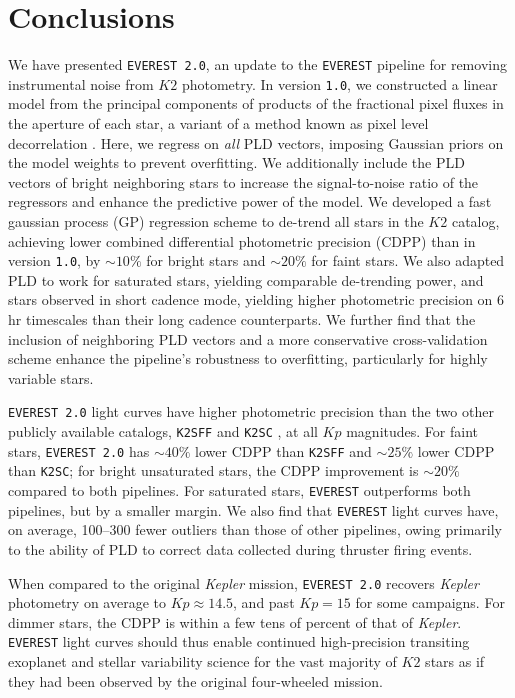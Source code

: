 \documentclass[]{emulateapj}
\newcommand{\Kp}{\ensuremath{Kp}}
\begin{document}
\section{Conclusions}
\label{sec:conclusions}
We have presented \texttt{EVEREST 2.0}, an update to the \texttt{EVEREST} pipeline
\citep{Luger16} for removing instrumental noise from $K2$ photometry. In version
\texttt{1.0}, we constructed a linear model from the principal components of
products of the fractional pixel fluxes in the aperture of each star, a variant
of a method known as pixel level decorrelation \citep[PLD,][]{Deming15}. Here,
we regress on \emph{all} PLD vectors, imposing Gaussian priors on the model
weights to prevent overfitting. We additionally include the PLD vectors of bright
neighboring stars to increase the signal-to-noise ratio of the regressors and
enhance the predictive power of the model. We developed a fast gaussian process (GP)
regression scheme to de-trend all stars in the $K2$ catalog, achieving lower
combined differential photometric precision (CDPP) than in version \texttt{1.0},
by ${\sim}10\%$ for bright stars and ${\sim}20\%$ for faint stars. We also
adapted PLD to work for saturated stars, yielding comparable de-trending power,
and stars observed in short cadence mode, yielding higher photometric precision
on 6 hr timescales than their long cadence counterparts.
We further find that the inclusion of neighboring PLD vectors and a
more conservative cross-validation scheme enhance the pipeline's robustness
to overfitting, particularly for highly variable stars.

\texttt{EVEREST 2.0} light curves have higher photometric precision than the two
other publicly available catalogs, \texttt{K2SFF} \citep{VanderburgJohnson14}
and \texttt{K2SC} \citep{Aigrain16}, at all $\Kp$ magnitudes. For faint stars,
\texttt{EVEREST 2.0} has ${\sim}40\%$ lower CDPP than \texttt{K2SFF} and
${\sim}25\%$ lower CDPP than \texttt{K2SC}; for bright unsaturated stars, the CDPP
improvement is ${\sim}20\%$ compared to both pipelines. For saturated stars,
\texttt{EVEREST} outperforms both pipelines, but by a smaller margin. We also
find that \texttt{EVEREST} light curves have, on average, 100--300 fewer outliers
than those of other pipelines, owing primarily to the ability of PLD to correct
data collected during thruster firing events.

When compared to the original \emph{Kepler} mission, \texttt{EVEREST 2.0}
recovers \emph{Kepler} photometry on average to $\Kp \approx 14.5$, and past
$\Kp = 15$ for some campaigns. For dimmer stars, the CDPP is within a few tens
of percent of that of \emph{Kepler}. \texttt{EVEREST} light curves should thus enable
continued high-precision transiting exoplanet and stellar variability science
for the vast majority of $K2$ stars as if they had been observed by the original
four-wheeled mission.
\end{document}
